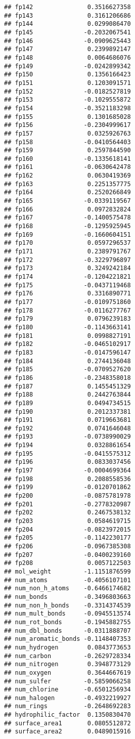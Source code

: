 \documentclass[]{article}
\begin{document}
\begin{verbatim}
## fp142               0.3516627358
## fp143               0.3161206686
## fp144               0.0299086470
## fp145              -0.2032067541
## fp146              -0.0909625443
## fp147               0.2399892147
## fp148               0.0064686076
## fp149              -0.0242899342
## fp150               0.1356166423
## fp151               0.1203091571
## fp152              -0.0182527819
## fp153              -0.1029555872
## fp154              -0.3521183298
## fp155               0.1301685028
## fp156              -0.2304999617
## fp157               0.0325926763
## fp158              -0.0410564403
## fp159               0.2597844590
## fp160              -0.1335618141
## fp161              -0.0630642478
## fp162               0.0630419369
## fp163               0.2251357775
## fp164               0.2520266849
## fp165              -0.0339119567
## fp166               0.0972832824
## fp167              -0.1400575478
## fp168              -0.1295925945
## fp169              -0.1660604151
## fp170               0.0597296537
## fp171               0.2389791767
## fp172              -0.3229796897
## fp173               0.3249242184
## fp174              -0.1204221821
## fp175              -0.0437119468
## fp176               0.3316890771
## fp177              -0.0109751860
## fp178              -0.0116277767
## fp179               0.0796239183
## fp180              -0.1143663141
## fp181               0.0998827191
## fp182              -0.0465102917
## fp183              -0.0147596147
## fp184               0.2744136048
## fp185              -0.0709527620
## fp186              -0.2348358018
## fp187               0.1455451329
## fp188               0.2442763844
## fp189               0.0494734515
## fp190               0.2012337381
## fp191               0.0719663681
## fp192               0.0741646048
## fp193              -0.0738990029
## fp194               0.0328861654
## fp195              -0.0415575312
## fp196               0.0833037456
## fp197              -0.0004699364
## fp198               0.2088558536
## fp199              -0.0120701862
## fp200              -0.0875781978
## fp201              -0.2778320987
## fp202               0.2467538132
## fp203               0.0584619715
## fp204              -0.0823972015
## fp205              -0.1142230177
## fp206              -0.0967385308
## fp207              -0.0400239160
## fp208               0.0057122503
## mol_weight         -1.1151876599
## num_atoms          -0.4056107101
## num_non_h_atoms    -0.6466174682
## num_bonds          -0.3496803663
## num_non_h_bonds    -0.3314374539
## num_mult_bonds     -0.0945513574
## num_rot_bonds      -0.1945882755
## num_dbl_bonds      -0.0311888707
## num_aromatic_bonds -0.1148407353
## num_hydrogen        0.0843773653
## num_carbon         -0.2629728334
## num_nitrogen        0.3948773129
## num_oxygen          0.3644667619
## num_sulfer         -0.5859066258
## num_chlorine       -0.6501256934
## num_halogen        -0.4932219927
## num_rings          -0.2648692283
## hydrophilic_factor  0.1350830470
## surface_area1       0.0805512872
## surface_area2       0.0489015916
\end{verbatim}
\end{document}
